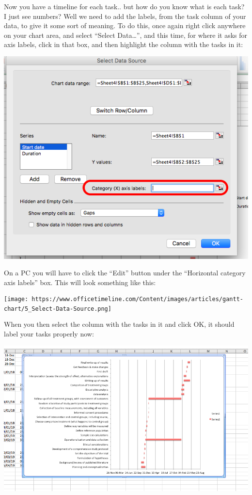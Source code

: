 \documentclass[]{book}
\theoremstyle{definition}
\theoremstyle{definition}
\theoremstyle{definition}
\theoremstyle{remark}
\begin{document}
Now you have a timeline for each task.. but how do you know what is each
task? I just see numbers? Well we need to add the labels, from the task
column of your data, to give it some sort of meaning. To do this, once
again right click anywhere on your chart area, and select ``Select
Data\ldots{}'', and this time, for where it asks for axis labels, click
in that box, and then highlight the column with the tasks in it:

\includegraphics{imgs/axis_labels_gantt.png}

On a PC you will have to click the ``Edit'' button under the
``Horizontal category axis labels'' box. This will look something like
this:

\texttt{[image: https://www.officetimeline.com/Content/images/articles/gantt-chart/5\_Select-Data-Source.png]}

When you then select the column with the tasks in it and click OK, it
should label your tasks properly now:

\includegraphics{imgs/gantt_labelled.png}
\end{document}
